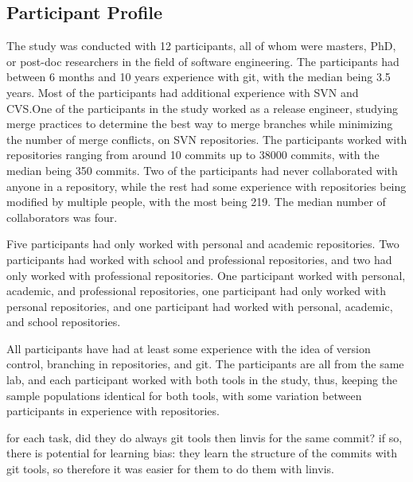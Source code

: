 \subsection{Participant Profile}
\label{sub:participant_profile}

The study was conducted with 12 participants, all of whom were
masters, PhD, or post-doc researchers in the field of software
engineering. The participants had between 6 months and 10 years
experience with git, with the median being 3.5 years. Most of the
participants had additional experience with SVN and CVS.\@ One of the
participants in the study worked as a release engineer, studying merge
practices to determine the best way to merge branches while minimizing
the number of merge conflicts, on SVN repositories. The participants
worked with repositories ranging from around 10 commits up to 38000
commits, with the median being 350 commits. Two of the participants had
never collaborated with anyone in a repository, while the rest had some
experience with repositories being modified by multiple people, with the
most being 219. The median number of collaborators was four.

Five participants had only worked with personal and academic
repositories. Two participants had worked with school and
professional repositories, and two had only worked with professional
repositories. One participant worked with personal, academic, and
professional repositories, one participant had only worked with personal
repositories, and one participant had worked with personal, academic,
and school repositories.

All participants have had at least some experience with the idea of
version control, branching in repositories, and git. The participants
are all from the same lab, and each participant worked with both tools
in the study, thus, keeping the sample populations identical for both
tools, with some variation between participants in experience with
repositories.

for each task, did they do always git tools then linvis for the same commit?  if so, there is potential for learning
bias: they learn the structure of the commits with git tools, so therefore it was easier for them to do
them with linvis.



